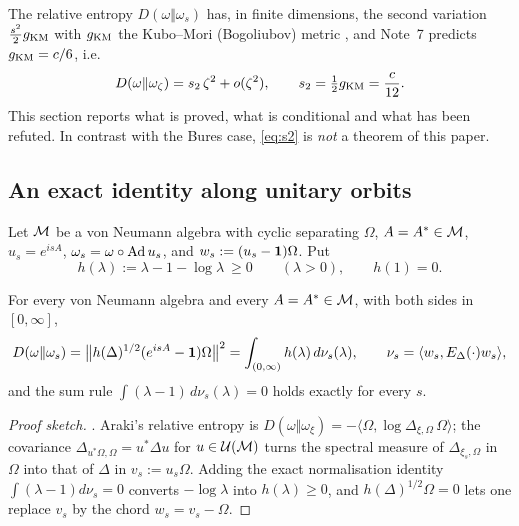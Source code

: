 The relative entropy $D(\omega\Vert\omega_{s})$ has, in finite dimensions, the second variation
$\frac{s^{2}}{2}g_{\mathrm{KM}}$ with $g_{\mathrm{KM}}$ the Kubo--Mori (Bogoliubov) metric \cite{Hiai}, and Note~7 \cite{Note7}
predicts $g_{\mathrm{KM}}=c/6$, i.e.
\begin{equation}\label{eq:s2}
 D(\omega\Vert\omega_{\zeta})=s_{2}\,\zeta^{2}+o(\zeta^{2}),\qquad s_{2}=\tfrac12g_{\mathrm{KM}}=\frac{c}{12}.
\end{equation}
This section reports what is proved, what is conditional and what has been refuted.  In contrast with the
Bures case, \eqref{eq:s2} is \emph{not} a theorem of this paper.

\subsection{An exact identity along unitary orbits}

Let $\mathcal M$ be a von Neumann algebra with cyclic separating $\Omega$, $A=A^{*}\in\mathcal M$, $u_{s}=e^{isA}$,
$\omega_{s}=\omega\circ\operatorname{Ad} u_{s}$, and $w_{s}:=(u_{s}-\mathbf 1)\Omega$.  Put
\begin{equation}\label{eq:hdef}
 h(\lambda):=\lambda-1-\log\lambda\ \ge0\qquad(\lambda>0),\qquad h(1)=0.
\end{equation}

\begin{theorem}\label{thm:kmexact}
For every von Neumann algebra and every $A=A^{*}\in\mathcal M$, with both sides in $[0,\infty]$,
\begin{equation}\label{eq:kmexact}
 D(\omega\Vert\omega_{s})=\bigl\|h(\Delta)^{1/2}(e^{isA}-\mathbf 1)\Omega\bigr\|^{2}
 =\int_{(0,\infty)}h(\lambda)\,d\nu_{s}(\lambda),
 \qquad \nu_{s}=\langle w_{s},E_{\Delta}(\cdot)w_{s}\rangle,
\end{equation}
and the sum rule $\int(\lambda-1)\,d\nu_{s}(\lambda)=0$ holds exactly for every $s$.
\end{theorem}

\begin{proof}[Proof sketch]
\cite[Thm.~3.3]{RigorKM}.  Araki's relative entropy \cite{Araki} is
$D(\omega\Vert\omega_{\xi})=-\langle\Omega,\log\Delta_{\xi,\Omega}\,\Omega\rangle$; the covariance
$\Delta_{u^{*}\Omega,\Omega}=u^{*}\Delta u$ for $u\in\mathcal U(\mathcal M)$ turns the spectral measure of
$\Delta_{\xi_{s},\Omega}$ in $\Omega$ into that of $\Delta$ in $v_{s}:=u_{s}\Omega$.  Adding the exact
normalisation identity $\int(\lambda-1)d\nu_{s}=0$ converts $-\log\lambda$ into $h(\lambda)\ge0$, and
$h(\Delta)^{1/2}\Omega=0$ lets one replace $v_{s}$ by the chord $w_{s}=v_{s}-\Omega$.
\end{proof}


